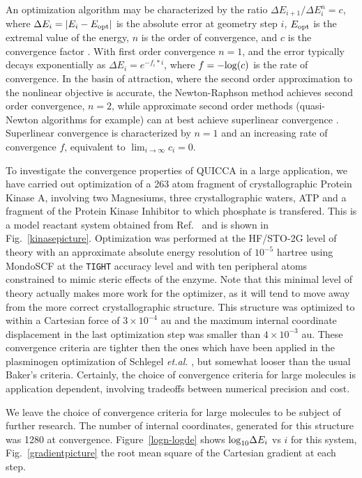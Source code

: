 \documentclass[prl,aps,preprint,superbib,12pt]{revtex4}
\begin{document}
An optimization algorithm may be characterized by the ratio ${\Delta E_{i+1}}/{\Delta E_{i}^n} =c$,
where $\Delta E_i = |E_{i}-E_{\rm opt}| $ is the absolute error at geometry step $i$,
$E_{\rm opt}$ is the extremal value of the energy, $n$ is the order of convergence, 
and $c$ is the convergence factor \cite{AQuarteroni00}.  With first order convergence $n=1$, and
the error typically decays exponentially as $\Delta E_i = e^{-f_i*i}$, where $f=-{\rm log}(c)$ is the 
rate of convergence. In the basin of attraction, where the second order approximation 
to the nonlinear objective is accurate, the Newton-Raphson method achieves second order convergence,
$ n=2$, while approximate second order methods (quasi-Newton algorithms for example) can 
at best achieve superlinear convergence \cite{RFletcher81,GFogarasi92}.   Superlinear 
convergence is characterized by $n=1$ and an increasing rate of convergence $f$, equivalent to 
$\lim_{i \to \infty} c_i = 0$.  

To investigate the convergence properties of QUICCA in a large application, we have carried out
optimization of a 263 atom fragment of crystallographic Protein Kinase A, involving two Magnesiums,
three crystallographic waters, ATP and a fragment of the Protein Kinase Inhibitor to which phosphate 
is transfered. This is a model reactant system obtained from Ref.~ and is shown in 
Fig.~\ref{kinasepicture}.  Optimization was performed at the HF/STO-2G level of theory with an 
approximate absolute energy resolution of $10^{-5}$ hartree using MondoSCF \cite{MondoSCF} at the 
{\tt TIGHT} accuracy level and with ten peripheral atoms  constrained to mimic steric effects of the enzyme.  
Note that this minimal level of theory actually makes more work for the optimizer, as it will tend to 
move away from the more correct crystallographic structure.   This structure was optimized to within a 
Cartesian force of $3\times10^{-4}$ au and 
the maximum internal coordinate displacement in 
the last optimization step was smaller than
$4\times10^{-3}$ au. These convergence criteria are 
tighter then the ones which have been
applied in the plasminogen optimization of Schlegel {\it et.al.} 
\cite{HSchlegel00}, but somewhat looser than the usual Baker's criteria.
Certainly, the choice of convergence criteria for large molecules 
is application dependent, involving tradeoffs between 
numerical precision and cost.

We leave the choice of convergence criteria for large molecules 
to be subject of further research.
The number of internal coordinates, generated for this structure was 1280 at convergence.  Figure~\ref{logn-logde} 
shows ${\rm log}_{10} \Delta E_i$ vs $i$ for this system, Fig.~\ref{gradientpicture} the root mean square 
of the Cartesian gradient at each step.
\end{document}
